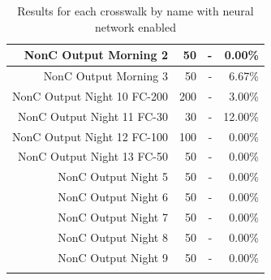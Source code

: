 \documentclass[12pt]{ucthesis}
\begin{document}
\begin{longtable}{|r|r|r|r|}
    \hline
    NonC Output Morning 2 & 50    & -     & 0.00\% \bigstrut\\
    \hline
    NonC Output Morning 3 & 50    & -     & 6.67\% \bigstrut\\
    \hline
    NonC Output Night 10 FC-200 & 200   & -     & 3.00\% \bigstrut\\
    \hline
    NonC Output Night 11 FC-30 & 30    & -     & 12.00\% \bigstrut\\
    \hline
    NonC Output Night 12 FC-100 & 100   & -     & 0.00\% \bigstrut\\
    \hline
    NonC Output Night 13 FC-50 & 50    & -     & 0.00\% \bigstrut\\
    \hline
    NonC Output Night 5 & 50    & -     & 0.00\% \bigstrut\\
    \hline
    NonC Output Night 6 & 50    & -     & 0.00\% \bigstrut\\
    \hline
    NonC Output Night 7 & 50    & -     & 0.00\% \bigstrut\\
    \hline
    NonC Output Night 8 & 50    & -     & 0.00\% \bigstrut\\
    \hline
    NonC Output Night 9 & 50    & -     & 0.00\% \bigstrut\\
    \hline


    \caption{Results for each crosswalk by name with neural network enabled}
    \label{tab:appendixcrosswalkresults} 
    \end{longtable}
\end{document}

